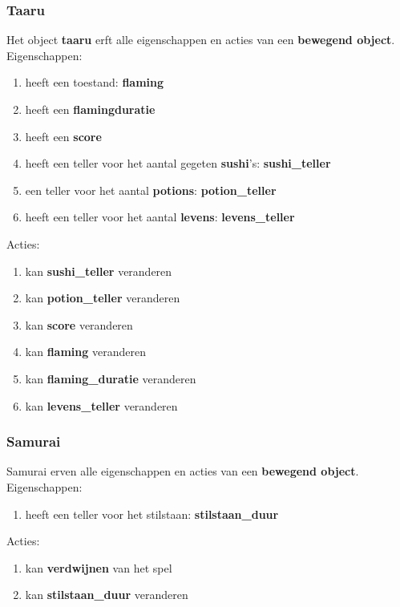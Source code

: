 \subsubsection{Taaru}
Het object \textbf{taaru} erft alle eigenschappen en acties van een \textbf{bewegend object}. \\
Eigenschappen:
\begin{enumerate}
  \item heeft een toestand: \textbf{flaming}
  \item heeft een \textbf{flamingduratie}
  \item heeft een \textbf{score}
  \item heeft een teller voor het aantal gegeten \textbf{sushi}'s: \textbf{sushi\_teller}
  \item een teller voor het aantal \textbf{potions}: \textbf{potion\_teller}
  \item heeft een teller voor het aantal \textbf{levens}: \textbf{levens\_teller}

\end{enumerate}
Acties:
\begin{enumerate}
  \item kan \textbf{sushi\_teller} veranderen
  \item kan \textbf{potion\_teller} veranderen
  \item kan \textbf{score} veranderen
  \item kan \textbf{flaming} veranderen
  \item kan \textbf{flaming\_duratie} veranderen
  \item kan \textbf{levens\_teller} veranderen

\end{enumerate}

\subsubsection{Samurai}
Samurai erven alle eigenschappen en acties van een \textbf{bewegend object}. \\
Eigenschappen:
\begin{enumerate}
  \item heeft een teller voor het stilstaan: \textbf{stilstaan\_duur}
\end{enumerate}
Acties:
\begin{enumerate}
  \item kan \textbf{verdwijnen} van het spel
  \item kan \textbf{stilstaan\_duur} veranderen
\end{enumerate}

